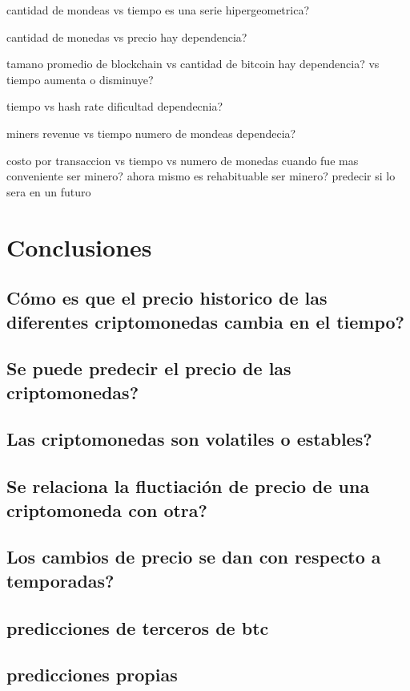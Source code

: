 \documentclass[12pt,letterpaper]{article}
\begin{document}
    cantidad de mondeas vs tiempo
        es una serie hipergeometrica?

    cantidad de monedas vs precio
        hay dependencia?

    tamano promedio de blockchain
        vs cantidad de bitcoin
            hay dependencia?
        vs tiempo
            aumenta o disminuye?

    tiempo vs hash rate
        dificultad
            dependecnia?

    miners revenue vs tiempo
        numero de mondeas
         dependecia?

    costo por transaccion vs tiempo
        vs numero de monedas
            cuando fue mas conveniente ser minero?
            ahora mismo es rehabituable ser minero?
                predecir si lo sera en un futuro

\section*{Conclusiones}

	\subsection*{Cómo es que el precio historico de las diferentes criptomonedas cambia en el tiempo?}
	\subsection*{Se puede predecir el precio de las criptomonedas?}
	\subsection*{Las criptomonedas son volatiles o estables?}
	\subsection*{Se relaciona la fluctiación de precio de una criptomoneda con otra?}
	\subsection*{Los cambios de precio se dan con respecto a temporadas?}
	\subsection*{predicciones de terceros de btc}
	\subsection*{predicciones propias}
\end{document}
